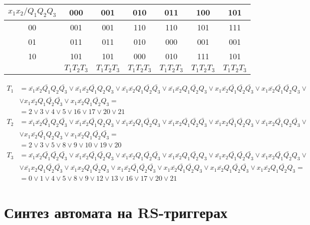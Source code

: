 \documentclass[listings]{labreport}
\begin{document}
\begin{tabular}{|*{7}{c|}}
\hline
$x_1x_2/Q_1Q_2Q_3$ & 000 & 001 & 010 & 011 & 100 & 101\\\hline
00 & 001 & 001 & 110 & 110 & 101 & 111\\\hline
01 & 011 & 011 & 010 & 000 & 001 & 001\\\hline
10 & 101 & 101 & 000 & 010 & 111 & 101\\\hline
 & $T_1T_2T_3$ & $T_1T_2T_3$ & $T_1T_2T_3$ & $T_1T_2T_3$ & $T_1T_2T_3$ & $T_1T_2T_3$\\\hline
\end{tabular}

\begin{align*}
T_1 & = \bar{x_1}\bar{x_2}\bar{Q_1}Q_2\bar{Q_3} \lor \bar{x_1}\bar{x_2}\bar{Q_1}Q_2Q_3 \lor \bar{x_1}\bar{x_2}Q_1\bar{Q_2}\bar{Q_3} \lor \bar{x_1}\bar{x_2}Q_1\bar{Q_2}Q_3 \lor x_1\bar{x_2}\bar{Q_1}\bar{Q_2}\bar{Q_3} \lor x_1\bar{x_2}\bar{Q_1}\bar{Q_2}Q_3 \lor \\ & \lor x_1\bar{x_2}Q_1\bar{Q_2}\bar{Q_3} \lor x_1\bar{x_2}Q_1\bar{Q_2}Q_3 = \\ & = 2 \lor 3 \lor 4 \lor 5 \lor 16 \lor 17 \lor 20 \lor 21 \\
T_2 & = \bar{x_1}\bar{x_2}\bar{Q_1}Q_2\bar{Q_3} \lor \bar{x_1}\bar{x_2}\bar{Q_1}Q_2Q_3 \lor \bar{x_1}\bar{x_2}Q_1\bar{Q_2}Q_3 \lor \bar{x_1}x_2\bar{Q_1}\bar{Q_2}\bar{Q_3} \lor \bar{x_1}x_2\bar{Q_1}\bar{Q_2}Q_3 \lor \bar{x_1}x_2\bar{Q_1}Q_2\bar{Q_3} \lor \\ & \lor x_1\bar{x_2}\bar{Q_1}Q_2Q_3 \lor x_1\bar{x_2}Q_1\bar{Q_2}\bar{Q_3}   = \\ & = 2 \lor 3 \lor 5 \lor 8 \lor 9 \lor 10 \lor 19 \lor 20 \\
T_3 & = \bar{x_1}\bar{x_2}\bar{Q_1}\bar{Q_2}\bar{Q_3} \lor \bar{x_1}\bar{x_2}\bar{Q_1}\bar{Q_2}Q_3 \lor \bar{x_1}\bar{x_2}Q_1\bar{Q_2}\bar{Q_3} \lor \bar{x_1}\bar{x_2}Q_1\bar{Q_2}Q_3 \lor \bar{x_1}x_2\bar{Q_1}\bar{Q_2}\bar{Q_3} \lor \bar{x_1}x_2\bar{Q_1}\bar{Q_2}Q_3 \lor \\ & \lor \bar{x_1}x_2Q_1\bar{Q_2}\bar{Q_3} \lor \bar{x_1}x_2Q_1\bar{Q_2}Q_3 \lor x_1\bar{x_2}\bar{Q_1}\bar{Q_2}\bar{Q_3} \lor x_1\bar{x_2}\bar{Q_1}\bar{Q_2}Q_3 \lor x_1\bar{x_2}Q_1\bar{Q_2}\bar{Q_3} \lor x_1\bar{x_2}Q_1\bar{Q_2}Q_3 = \\ & = 0 \lor 1 \lor 4 \lor 5 \lor 8 \lor 9 \lor 12 \lor 13 \lor 16 \lor 17 \lor 20 \lor 21
\end{align*}

\section*{Синтез автомата на RS-триггерах}
\end{document}
